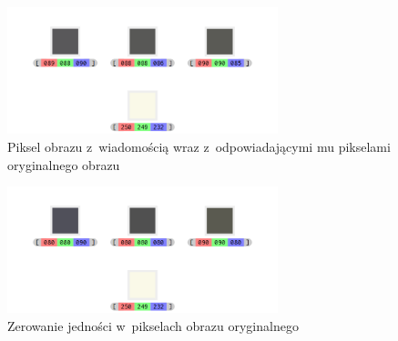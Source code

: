 \documentclass[12pt,a4paper]{article}
\begin{document}



    \begin{figure}[!h]
        \centering
        \includegraphics[width=0.7\textwidth]{pieces/wybor-pikseli}
        \caption{Piksel obrazu z~wiadomością wraz z~odpowiadającymi mu pikselami oryginalnego obrazu} \label{fig:wybor-pikseli}
    \end{figure}

    \begin{figure}[!h]
        \centering
        \includegraphics[width=0.7\textwidth]{pieces/zerowanie-pikseli}
        \caption{Zerowanie jedności w~pikselach obrazu oryginalnego} \label{fig:zerowanie-pikseli}
    \end{figure}
\end{document}
